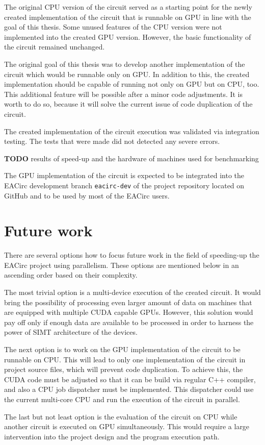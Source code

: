 \documentclass[12pt,oneside]{fithesis2}
\newcommand{\todo}{
	\noindent
	{\large\color{red}\textbf{TODO}}
}
\begin{document}
The original CPU version of the circuit served as a starting point for the newly created implementation of the circuit that is runnable on GPU in line with the goal of this thesis. Some unused features of the CPU version were not implemented into the created GPU version. However, the basic functionality of the circuit remained unchanged. 

The original goal of this thesis was to develop another implementation of the circuit which would be runnable only on GPU. In addition to this, the created implementation should be capable of running not only on GPU but on CPU, too. This additional feature will be possible after a minor code adjustments. It is worth to do so, because it will solve the current issue of code duplication of the circuit.

The created implementation of the circuit execution was validated via integration testing. The tests that were made did not detected any severe errors.
 
\bigskip
\todo{results of speed-up and the hardware of machines used for benchmarking}
\bigskip

The GPU implementation of the circuit is expected to be integrated into the EACirc development branch \texttt{eacirc-dev} of the project repository located on GitHub and to be used by most of the EACirc users.

\section{Future work}

There are several options how to focus future work in the field of speeding-up the EACirc project using parallelism. These options are mentioned below in an ascending order based on their complexity.

The most trivial option is a multi-device execution of the created circuit. It would bring the possibility of processing even larger amount of data on machines that are equipped with multiple CUDA capable GPUs. However, this solution would pay off only if enough data are available to be processed in order to harness the power of SIMT architecture of the devices.

The next option is to work on the GPU implementation of the circuit to be runnable on CPU. This will lead to only one implementation of the circuit in project source files, which will prevent code duplication. To achieve this, the CUDA code must be adjusted so that it can be build via regular C++ compiler, and also a CPU job dispatcher must be implemented. This dispatcher could use the current multi-core CPU and run the execution of the circuit in parallel.

The last but not least option is the evaluation of the circuit on CPU while another circuit is executed on GPU simultaneously. This would require a large intervention into the project design and the program execution path.





\printbibliography[heading=bibintoc]
\end{document}

